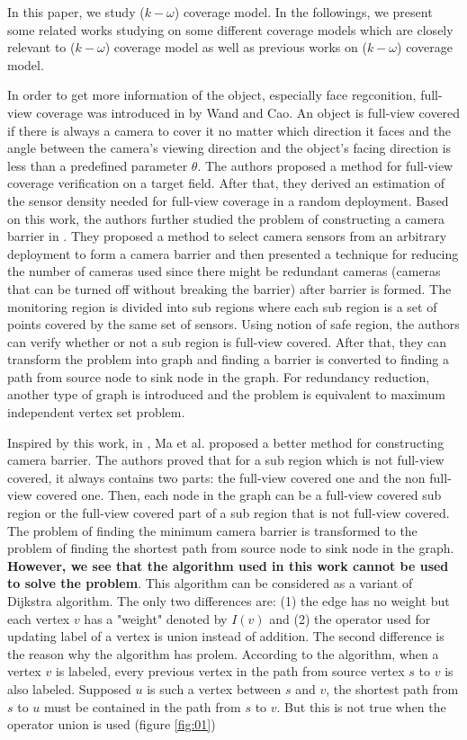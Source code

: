 In this paper, we study ($k-\omega$) coverage model. In the followings, we present some related works studying on some different coverage models which are closely relevant to ($k-\omega$) coverage model as well as previous works on ($k-\omega$) coverage model. \par
In order to get more information of the object, especially face regconition, full-view coverage was introduced in \cite{wang2011full} by Wand and Cao. An object is full-view covered if there is always a camera to cover it no matter which direction it faces and the angle between the camera’s viewing direction and the object’s facing direction is less than a predefined parameter $\theta$.
The authors proposed a method for full-view coverage verification on a target field. After that, they derived an estimation of the sensor density needed for full-view coverage in a random deployment. Based on this work, the authors further studied the problem of constructing a camera barrier in \cite{wang2011barrier}. They proposed a method to select camera sensors from an arbitrary deployment to form a camera barrier and then presented a technique for reducing the number of cameras used since there might be redundant cameras (cameras that can be turned off without breaking the barrier) after barrier is formed. The monitoring region is divided into sub regions where each sub region is a set of points covered by the same set of sensors. Using notion of safe region, the authors can verify whether or not a sub region is full-view covered. After that, they can transform the problem into graph and finding a barrier is converted to finding a path from source node to sink node in the graph. For redundancy reduction, another type of graph is introduced and the problem is equivalent to maximum independent vertex set problem. \par
Inspired by this work, in \cite{ma2012minimum}, Ma et al. proposed a better method for constructing camera barrier. The authors proved that for a sub region which is not full-view covered, it always contains two parts: the full-view covered one and the non full-view covered one. Then, each node in the graph can be a full-view covered sub region or the full-view covered part of a sub region that is not full-view covered. The problem of finding the minimum camera barrier is transformed to the problem of finding the shortest path from source node to sink node in the graph. \textcolor{ProcessBlue}{\bfseries However, we see that the algorithm used in this work cannot be used to solve the problem}. This algorithm can be considered as a variant of Dijkstra algorithm. The only two differences are: (1) the edge has no weight but each vertex $v$ has a "weight" denoted by $I(v)$ and (2) the operator used for updating label of a vertex is union instead of addition. The second difference is the reason why the algorithm has prolem. According to the algorithm, when a vertex $v$ is labeled, every previous vertex in the path from source vertex $s$ to $v$ is also labeled. Supposed $u$ is such a vertex between $s$ and $v$, the shortest path from $s$ to $u$ must be contained in the path from $s$ to $v$. But this is not true when the operator union is used (figure \ref{fig:01})
